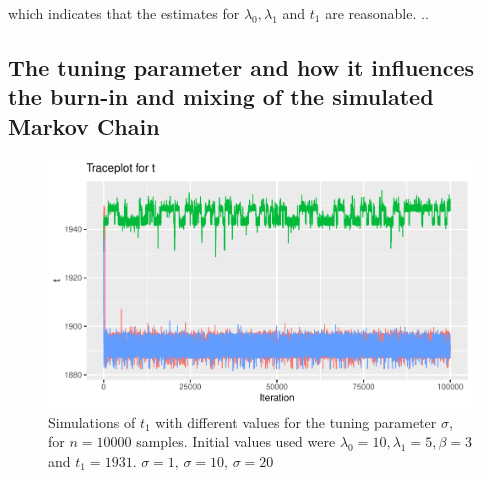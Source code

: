 which indicates that the estimates for $\lambda_0, \lambda_1$ and $t_1$ are reasonable. ..

\subsection{The tuning parameter and how it influences the burn-in and mixing of the simulated Markov Chain}

\begin{figure}[h]
    \centering
    \includegraphics[width = \textwidth]{Images/tuning_stuck_t.pdf}
    \caption{Simulations of $t_1$ with different values for the tuning parameter $\sigma$, for $n = 10000$ samples. Initial values used were $\lambda_0 = 10, \lambda_1 = 5, \beta = 3$ and $t_1 = 1931$.  $\sigma = 1$,  $\sigma= 10$,  $\sigma= 20$}
    \label{fig:tuning_t_single}
\end{figure}

